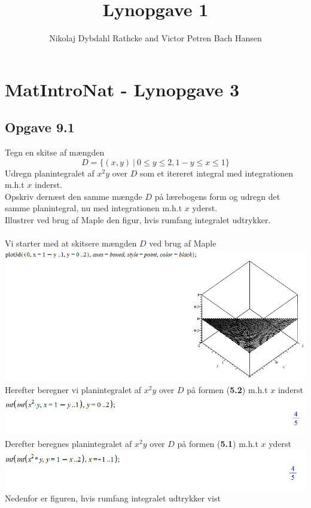 \documentclass[12pt]{article}
\title{Lynopgave 1}
\author{Nikolaj Dybdahl Rathcke and Victor Petren Bach Hansen}
\begin{document}
\section*{MatIntroNat - Lynopgave 3}
\subsection*{Opgave 9.1}
Tegn en skitse af mængden
$$D= \{(x,y)\:|\: 0\leq y\leq 2, 1-y\leq x\leq 1\}$$
Udregn planintegralet af $x^2y$ over $D$ som et itereret integral med integrationen m.h.t $x$ inderst.\\
Opskriv dernæst den samme mængde $D$ på lærebogens form og udregn det samme planintegral, nu med integrationen m.h.t $x$ yderst.\\
Illustrer ved brug af Maple den figur, hvis rumfang integralet udtrykker.\\
\\
Vi starter med at skitsere mængden $D$ ved brug af Maple\\
\includegraphics[scale=0.6]{Pic1}\\
Herefter beregner vi planintegralet af $x^2y$ over $D$ på formen (\textbf{5.2}) m.h.t $x$ inderst\\
\includegraphics[scale=0.6]{Pic2}\\
Derefter beregnes planintegralet af $x^2y$ over $D$ på formen (\textbf{5.1}) m.h.t $x$ yderst\\
\includegraphics[scale=0.6]{Pic3}\\
Nedenfor er figuren, hvis rumfang integralet udtrykker vist\\
\end{document}

